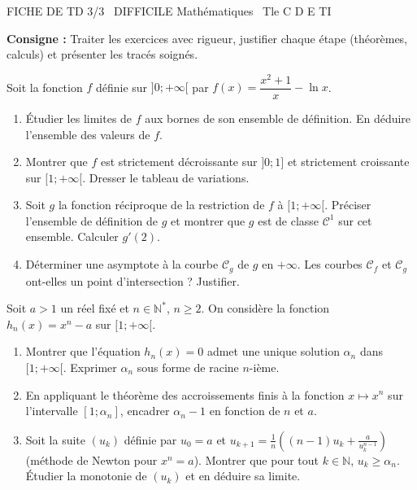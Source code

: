\documentclass[11pt]{article}
\begin{document}
\begin{tcolorbox}[enhanced,colback=popink,colframe=popink,arc=10pt,boxrule=0pt,left=12pt,right=12pt,top=9pt,bottom=9pt]
{\color{white}\popxbold\small FICHE DE TD 3/3 \textbullet\ DIFFICILE \hfill Mathématiques \textbullet\ Tle C D E TI\par}
\end{tcolorbox}
\vspace{4pt}
\noindent \textbf{Consigne :} Traiter les exercices avec rigueur, justifier chaque étape (théorèmes, calculs) et présenter les tracés soignés.

\begin{exercice}
Soit la fonction $f$ définie sur $]0; +\infty[$ par $f(x) = \dfrac{x^2 + 1}{x} - \ln x$.
\begin{enumerate}
    \item Étudier les limites de $f$ aux bornes de son ensemble de définition. En déduire l'ensemble des valeurs de $f$.
    \item Montrer que $f$ est strictement décroissante sur $]0; 1]$ et strictement croissante sur $[1; +\infty[$. Dresser le tableau de variations.
    \item Soit $g$ la fonction réciproque de la restriction de $f$ à $[1; +\infty[$. Préciser l'ensemble de définition de $g$ et montrer que $g$ est de classe $\mathcal{C}^1$ sur cet ensemble. Calculer $g'(2)$.
    \item Déterminer une asymptote à la courbe $\mathcal{C}_g$ de $g$ en $+\infty$. Les courbes $\mathcal{C}_f$ et $\mathcal{C}_g$ ont-elles un point d'intersection ? Justifier.
\end{enumerate}
\end{exercice}

\begin{exercice}
Soit $a > 1$ un réel fixé et $n \in \mathbb{N}^*$, $n \ge 2$. On considère la fonction $h_n(x) = x^n - a$ sur $[1; +\infty[$.
\begin{enumerate}
    \item Montrer que l'équation $h_n(x) = 0$ admet une unique solution $\alpha_n$ dans $[1; +\infty[$. Exprimer $\alpha_n$ sous forme de racine $n$-ième.
    \item En appliquant le théorème des accroissements finis à la fonction $x \mapsto x^n$ sur l'intervalle $[1; \alpha_n]$, encadrer $\alpha_n - 1$ en fonction de $n$ et $a$.
    \item Soit la suite $(u_k)$ définie par $u_0 = a$ et $u_{k+1} = \frac{1}{n}\left((n-1)u_k + \frac{a}{u_k^{n-1}}\right)$ (méthode de Newton pour $x^n=a$).
    Montrer que pour tout $k \in \mathbb{N}$, $u_k \ge \alpha_n$. Étudier la monotonie de $(u_k)$ et en déduire sa limite.
\end{enumerate}
\end{exercice}
\end{document}
